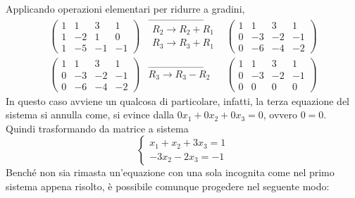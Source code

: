 \begin{es}
    Applicando operazioni elementari per ridurre a gradini,
    \begin{eqnarray}
      \label{eq:gauss-jorda2-4}
      \left(
      \begin{array}{ccc|c}
        1 & 1 & 3 & 1\\
        1 & -2 & 1 & 0\\
        1 & -5 & -1 & -1
      \end{array}\right) & \overrightarrow{
        \begin{matrix}
          R_2\to R_2+R_1\\
          R_3\to R_3+R_1
        \end{matrix}
      }& \left(
      \begin{array}{ccc|c}
        1 & 1 & 3 & 1\\
        0 & -3 & -2 & -1\\
        0 & -6 & -4 & -2
      \end{array}\right)\\
       \left(
       \begin{array}{ccc|c}
         1 & 1 & 3 & 1\\
         0 & -3 & -2 & -1\\
         0 & -6 & -4 & -2
       \end{array}\right) & \overrightarrow{
                             R_3\to R_3-R_2} &
                              \left(
      \begin{array}{ccc|c}
        1 & 1 & 3 & 1\\
        0 & -3 & -2 & -1\\
        0 & 0 & 0 & 0
      \end{array}\right)
    \end{eqnarray}
    In questo caso avviene un qualcosa di particolare, infatti, la terza
    equazione del sistema si annulla come, si evince dalla
    $0x_1+0x_2+0x_3 = 0$, ovvero $0 = 0$.\\
    Quindi trasformando da matrice a sistema
    \begin{equation}
      \label{eq:gauss-jorda2-5}
      \begin{cases}
        x_1+x_2+3x_3=1\\
        -3x_2-2x_3=-1
      \end{cases}
    \end{equation}
    Benché non sia rimasta un'equazione con una sola incognita come nel
    primo sistema appena risolto, è possibile comunque progedere
    nel seguente modo:\\

\end{es}
